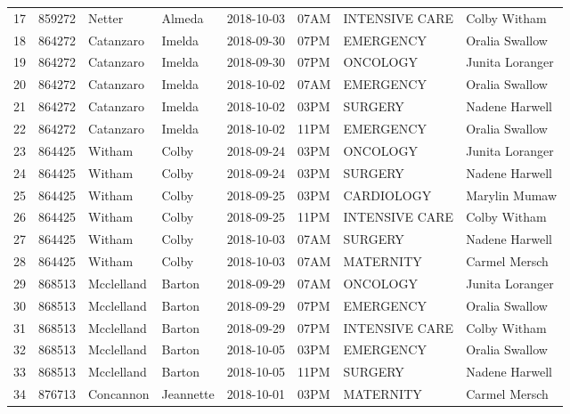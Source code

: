 \documentclass[11pt]{article}
\begin{document}
\begin{tabular}{|l|l|l|l|l|l|l|l|}
	17 &  859272 &      Netter &     Almeda &      2018-10-03 &  07AM &  INTENSIVE CARE &     Colby Witham \\
	18 &  864272 &   Catanzaro &     Imelda &      2018-09-30 &  07PM &       EMERGENCY &   Oralia Swallow \\
	19 &  864272 &   Catanzaro &     Imelda &      2018-09-30 &  07PM &        ONCOLOGY &  Junita Loranger \\
	20 &  864272 &   Catanzaro &     Imelda &      2018-10-02 &  07AM &       EMERGENCY &   Oralia Swallow \\
	21 &  864272 &   Catanzaro &     Imelda &      2018-10-02 &  03PM &         SURGERY &   Nadene Harwell \\
	22 &  864272 &   Catanzaro &     Imelda &      2018-10-02 &  11PM &       EMERGENCY &   Oralia Swallow \\
	23 &  864425 &      Witham &      Colby &      2018-09-24 &  03PM &        ONCOLOGY &  Junita Loranger \\
	24 &  864425 &      Witham &      Colby &      2018-09-24 &  03PM &         SURGERY &   Nadene Harwell \\
	25 &  864425 &      Witham &      Colby &      2018-09-25 &  03PM &      CARDIOLOGY &    Marylin Mumaw \\
	26 &  864425 &      Witham &      Colby &      2018-09-25 &  11PM &  INTENSIVE CARE &     Colby Witham \\
	27 &  864425 &      Witham &      Colby &      2018-10-03 &  07AM &         SURGERY &   Nadene Harwell \\
	28 &  864425 &      Witham &      Colby &      2018-10-03 &  07AM &       MATERNITY &    Carmel Mersch \\
	29 &  868513 &  Mcclelland &     Barton &      2018-09-29 &  07AM &        ONCOLOGY &  Junita Loranger \\
	30 &  868513 &  Mcclelland &     Barton &      2018-09-29 &  07PM &       EMERGENCY &   Oralia Swallow \\
	31 &  868513 &  Mcclelland &     Barton &      2018-09-29 &  07PM &  INTENSIVE CARE &     Colby Witham \\
	32 &  868513 &  Mcclelland &     Barton &      2018-10-05 &  03PM &       EMERGENCY &   Oralia Swallow \\
	33 &  868513 &  Mcclelland &     Barton &      2018-10-05 &  11PM &         SURGERY &   Nadene Harwell \\
	34 &  876713 &   Concannon &  Jeannette &      2018-10-01 &  03PM &       MATERNITY &    Carmel Mersch \\

\end{tabular}
\end{document}
